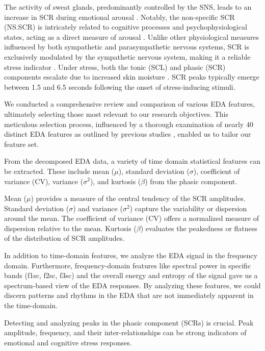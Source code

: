 The activity of sweat glands, predominantly controlled by the SNS, leads to an increase in SCR during emotional arousal \parencite{electrodermal}. Notably, the non-specific SCR (NS.SCR) is intricately related to cognitive processes and psychophysiological states, acting as a direct measure of arousal \parencite{177}. Unlike other physiological measures influenced by both sympathetic and parasympathetic nervous systems, SCR is exclusively modulated by the sympathetic nervous system, making it a reliable stress indicator \parencite{7}. Under stress, both the tonic (SCL) and phasic (SCR) components escalate due to increased skin moisture \parencite{stress}. SCR peaks typically emerge between 1.5 and 6.5 seconds following the onset of stress-inducing stimuli.

We conducted a comprehensive review and comparison of various EDA features, ultimately selecting those most relevant to our research objectives. This meticulous selection process, influenced by a thorough examination of nearly 40 distinct EDA features as outlined by previous studies \textcite{EDAFeatures}, enabled us to tailor our feature set.

From the decomposed EDA data, a variety of time domain statistical features can be extracted. These include mean ($\mu$), standard deviation ($\sigma$), coefficient of variance (CV), variance ($\sigma^2$), and kurtosis ($\beta$) from the phasic component.

Mean ($\mu$) provides a measure of the central tendency of the SCR amplitudes.
Standard deviation ($\sigma$) and variance ($\sigma^2$) capture the variability or dispersion around the mean.
The coefficient of variance (CV) offers a normalized measure of dispersion relative to the mean.
Kurtosis ($\beta$) evaluates the peakedness or flatness of the distribution of SCR amplitudes.

In addition to time-domain features, we analyze the EDA signal in the frequency domain. Furthermore, frequency-domain features like spectral power in specific bands (f1sc, f2sc, f3sc) and the overall energy and entropy of the signal gave us a spectrum-based view of the EDA responses. By analyzing these features, we could discern patterns and rhythms in the EDA that are not immediately apparent in the time-domain.


Detecting and analyzing peaks in the phasic component (SCRs) is crucial. Peak amplitude, frequency, and their inter-relationships can be strong indicators of emotional and cognitive stress responses.

